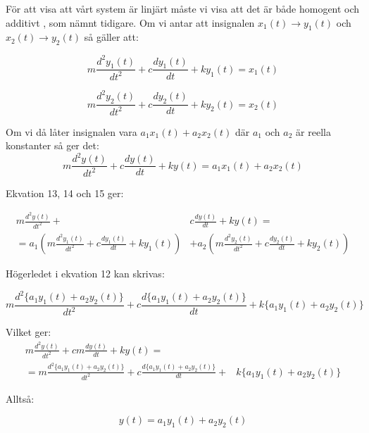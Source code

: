 \documentclass[10pt,a4paper]{article}
\begin{document}
För att visa att vårt system är linjärt måste vi visa att det är både homogent och additivt \cite[s.~42]{sune2000}, som nämnt tidigare. Om vi antar att insignalen $x_1(t) \rightarrow y_1(t)$ och $x_2(t) \rightarrow y_2(t)$ så gäller att:

\begin{equation}
m\frac{d^2y_1(t)}{dt^2} + c\frac{dy_1(t)}{dt} + ky_1(t) = x_1(t)
\end{equation}

\begin{equation}
m\frac{d^2y_2(t)}{dt^2} + c\frac{dy_2(t)}{dt} + ky_2(t) = x_2(t)
\end{equation}


Om vi då låter insignalen vara $a_1 x_1(t) + a_2 x_2(t)$ där $a_1$ och $a_2$ är reella konstanter så ger det:
\begin{equation}
m\frac{d^2y(t)}{dt^2} + c\frac{dy(t)}{dt} + ky(t) = a_1 x_1(t) + a_2 x_2(t)
\end{equation}

Ekvation 13, 14 och 15 ger:

\begin{equation}
\begin{split}
m\frac{d^2y(t)}{dt^2} + & c\frac{dy(t)}{dt} + ky(t) = \\ = a_1(m\frac{d^2y_1(t)}{dt^2} + c\frac{dy_1(t)}{dt} +  ky_1(t)) & + a_2(m\frac{d^2y_2(t)}{dt^2} + c\frac{dy_2(t)}{dt} + ky_2(t))
\end{split}
\end{equation}

Högerledet i ekvation 12 kan skrivas:

\begin{equation}
m\frac{d^2\{a_1y_1(t) + a_2y_2(t)\}}{dt^2} + c\frac{d\{a_1y_1(t) + a_2y_2(t)\}}{dt} + k\{a_1y_1(t) + a_2y_2(t)\}
\end{equation}

Vilket ger:
\begin{equation}
\begin{split}
m\frac{d^2y(t)}{dt^2} +  cm\frac{dy(t)}{dt} + ky(t) = & \\ = m\frac{d^2\{a_1y_1(t) + a_2y_2(t)\}}{dt^2} + c\frac{d\{a_1y_1(t) + a_2y_2(t)\}}{dt} + & k\{a_1y_1(t) + a_2y_2(t)\}
\end{split}
\end{equation}

Alltså:

\begin{equation}
y(t) = a_1 y_1(t) + a_2 y_2(t)
\end{equation}
\end{document}
